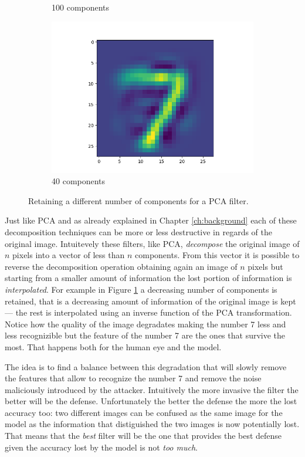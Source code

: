 \begin{figure}
\begin{subfigure}{0.3\linewidth}
    \caption{100 components}
  \end{subfigure}
  \begin{subfigure}{0.3\linewidth}
    \includegraphics[width=\linewidth]{filtered-input-pca-40-components.png}
    \caption{40 components}
  \end{subfigure}
  \caption{Retaining a different number of components for a PCA filter.}
  \label{fig:various-pca-reductions}
\end{figure}

Just like PCA and as already explained in Chapter \ref{ch:background}
each of these decomposition techniques can be more or less destructive
in regards of the original image. Intuitevely these filters, like PCA,
\emph{decompose} the original image of $n$ pixels into a vector of less
than $n$ components. From this vector it is possible to reverse the
decomposition operation obtaining again an image of $n$ pixels but
starting from a smaller amount of information the lost portion of
information is \emph{interpolated}. For example in Figure
\ref{fig:various-pca-reductions} a decreasing number of components is
retained, that is a decreasing amount of information of the original
image is kept --- the rest is interpolated using an inverse function of
the PCA transformation. Notice how the quality of the image degradates
making the number 7 less and less recognizible but the feature of the
number 7 are the ones that survive the most. That happens both for the
human eye and the model.

The idea is to find a balance between this degradation that will slowly
remove the features that allow to recognize the number 7 and remove the
noise maliciously introduced by the attacker. Intuitively the more
invasive the filter the better will be the defense. Unfortunately the
better the defense the more the lost accuracy too: two different images
can be confused as the same image for the model as the information that
distiguished the two images is now potentially lost. That means that
the \emph{best} filter will be the one that provides the best defense
given the accuracy lost by the model is not \emph{too much}.

